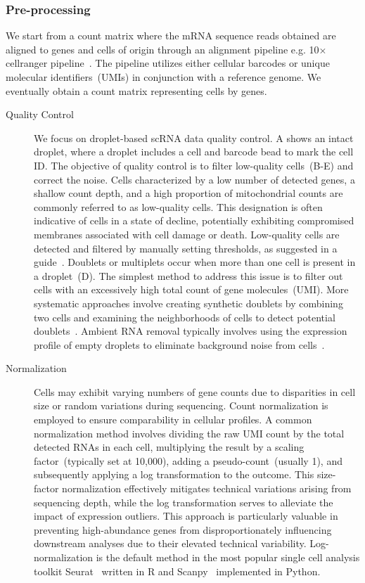 \subsubsection{Pre-processing}
We start from a count matrix where the mRNA sequence reads obtained are aligned to genes and cells of origin through an alignment pipeline e.g. 10$\times$ cellranger pipeline~\citep{zheng2017massively}. The pipeline utilizes either cellular barcodes or unique molecular identifiers~(UMIs) in conjunction with a reference genome. We eventually obtain a count matrix representing cells by genes.
\begin{description}
	\item[Quality Control]
	We focus on droplet-based scRNA data quality control. A shows an intact droplet, where a droplet includes a cell and barcode bead to mark the cell ID. The objective of quality control is to filter low-quality cells~(B-E) and correct the noise. Cells characterized by a low number of detected genes, a shallow count depth, and a high proportion of mitochondrial counts are commonly referred to as low-quality cells. This designation is often indicative of cells in a state of decline, potentially exhibiting compromised membranes associated with cell damage or death. Low-quality cells are detected and filtered by manually setting thresholds, as suggested in a guide~\citep{luecken2019current}. Doublets or multiplets occur when more than one cell is present in a droplet~(D). The simplest method to address this issue is to filter out cells with an excessively high total count of gene molecules~(UMI). More systematic approaches involve creating synthetic doublets by combining two cells and examining the neighborhoods of cells to detect potential doublets~\citep{mcginnis2019doubletfinder}. Ambient RNA removal typically involves using the expression profile of empty droplets to eliminate background noise from cells~\citep{janssen2023benchambient}.


	\item[Normalization]
	Cells may exhibit varying numbers of gene counts due to disparities in cell size or random variations during sequencing. Count normalization is employed to ensure comparability in cellular profiles. A common normalization method involves dividing the raw UMI count by the total detected RNAs in each cell, multiplying the result by a scaling factor~(typically set at 10,000), adding a pseudo-count~(usually 1), and subsequently applying a log transformation to the outcome. This size-factor normalization effectively mitigates technical variations arising from sequencing depth, while the log transformation serves to alleviate the impact of expression outliers. This approach is particularly valuable in preventing high-abundance genes from disproportionately influencing downstream analyses due to their elevated technical variability. Log-normalization is the default method in the most popular single cell analysis toolkit Seurat~\citep{stuart2019seurat3} written in R and Scanpy~\citep{wolf2018scanpy} implemented in Python.


\end{description}
